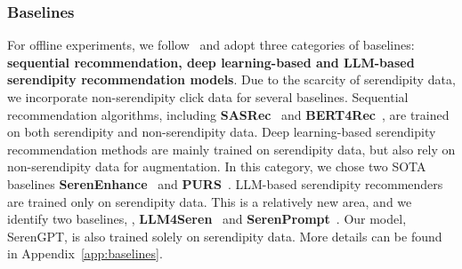 
\subsubsection{Baselines}
For offline experiments, we follow~\cite{fu2024art} and adopt three categories of baselines: \textbf{sequential recommendation, deep learning-based and LLM-based serendipity recommendation models}. Due to the scarcity of serendipity data, we incorporate non-serendipity click data for several baselines. Sequential recommendation algorithms, including \textbf{SASRec}~\cite{kang2018self} and \textbf{BERT4Rec}~\cite{sun2019bert4rec}, are trained on both serendipity and non-serendipity data. Deep learning-based serendipity recommendation methods are mainly trained on serendipity data, but also rely on non-serendipity data for augmentation. In this category, we chose two SOTA baselines \textbf{SerenEnhance}~\cite{fu2023wisdom} and  \textbf{PURS}~\cite{li2020purs}. LLM-based serendipity recommenders are trained only on serendipity data. This is a relatively new area, and we identify two baselines, \ie, \textbf{LLM4Seren}~\cite{tokutake2024can} and \textbf{SerenPrompt}~\cite{fu2024art}. Our model, SerenGPT, is also trained solely on serendipity data. More details can be found in Appendix~\ref{app:baselines}.

 

